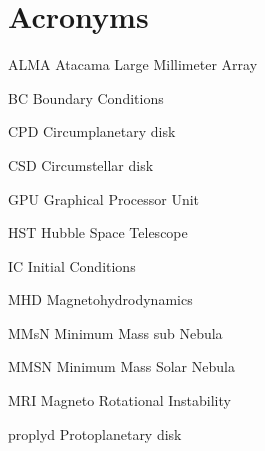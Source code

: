 \chapter*{Acronyms}

\begin{abbreviations}
\item[ALMA] Atacama Large Millimeter Array
\item[BC]  Boundary Conditions 
\item[CPD] Circumplanetary disk
\item[CSD] Circumstellar disk
\item[GPU] Graphical Processor Unit
\item[HST] Hubble Space Telescope
\item[IC] Initial Conditions
\item[MHD] Magnetohydrodynamics
\item[MMsN] Minimum Mass sub Nebula
\item[MMSN] Minimum Mass Solar Nebula
\item[MRI] Magneto Rotational Instability
\item[proplyd] Protoplanetary disk
\end{abbreviations}